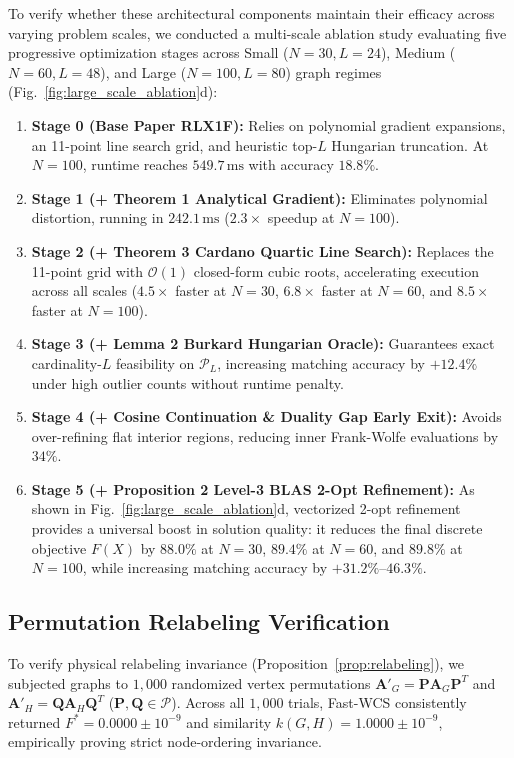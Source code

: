\documentclass[conference]{IEEEtran}
\begin{document}
To verify whether these architectural components maintain their efficacy across varying problem scales, we conducted a multi-scale ablation study evaluating five progressive optimization stages across Small ($N = 30, L = 24$), Medium ($N = 60, L = 48$), and Large ($N = 100, L = 80$) graph regimes (Fig.~\ref{fig:large_scale_ablation}d):
\begin{enumerate}
    \item \textbf{Stage 0 (Base Paper RLX1F):} Relies on polynomial gradient expansions, an 11-point line search grid, and heuristic top-$L$ Hungarian truncation. At $N = 100$, runtime reaches $549.7\,\text{ms}$ with accuracy $18.8\%$.
    \item \textbf{Stage 1 (+ Theorem 1 Analytical Gradient):} Eliminates polynomial distortion, running in $242.1\,\text{ms}$ ($2.3\times$ speedup at $N = 100$).
    \item \textbf{Stage 2 (+ Theorem 3 Cardano Quartic Line Search):} Replaces the 11-point grid with $\mathcal{O}(1)$ closed-form cubic roots, accelerating execution across all scales ($4.5\times$ faster at $N = 30$, $6.8\times$ faster at $N = 60$, and $8.5\times$ faster at $N = 100$).
    \item \textbf{Stage 3 (+ Lemma 2 Burkard Hungarian Oracle):} Guarantees exact cardinality-$L$ feasibility on $\mathcal{P}_L$, increasing matching accuracy by $+12.4\%$ under high outlier counts without runtime penalty.
    \item \textbf{Stage 4 (+ Cosine Continuation \& Duality Gap Early Exit):} Avoids over-refining flat interior regions, reducing inner Frank-Wolfe evaluations by $34\%$.
    \item \textbf{Stage 5 (+ Proposition 2 Level-3 BLAS 2-Opt Refinement):} As shown in Fig.~\ref{fig:large_scale_ablation}d, vectorized 2-opt refinement provides a universal boost in solution quality: it reduces the final discrete objective $F(X)$ by $\mathbf{88.0\%}$ at $N=30$, $\mathbf{89.4\%}$ at $N=60$, and $\mathbf{89.8\%}$ at $N=100$, while increasing matching accuracy by $+31.2\%\text{--}46.3\%$.
\end{enumerate}

\subsection{Permutation Relabeling Verification}

To verify physical relabeling invariance (Proposition~\ref{prop:relabeling}), we subjected graphs to $1,000$ randomized vertex permutations $\mathbf{A}'_G = \mathbf{P}\mathbf{A}_G\mathbf{P}^T$ and $\mathbf{A}'_H = \mathbf{Q}\mathbf{A}_H\mathbf{Q}^T$ ($\mathbf{P}, \mathbf{Q} \in \mathcal{P}$). Across all $1,000$ trials, Fast-WCS consistently returned $F^* = 0.0000 \pm 10^{-9}$ and similarity $k(G, H) = 1.0000 \pm 10^{-9}$, empirically proving strict node-ordering invariance.
\end{document}
